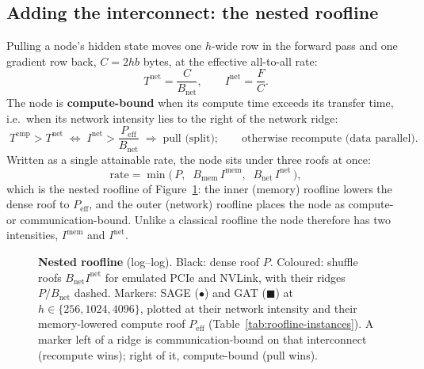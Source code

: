 

\subsection{Adding the interconnect: the nested roofline}
\label{sec:roofline-net}

Pulling a node's hidden state moves one $h$-wide row in the forward pass and one gradient row
back, $C = 2hb$ bytes, at the effective all-to-all rate:
\begin{equation}
  T^{\mathrm{net}} = \frac{C}{B_{\mathrm{net}}}, \qquad
  I^{\mathrm{net}} = \frac{F}{C}.
  \label{eq:Tnet}
\end{equation}
The node is \textbf{compute-bound} when its compute time exceeds its transfer time, i.e.\ when
its network intensity lies to the right of the network ridge:
\begin{equation}
  \boxed{\;
  T^{\mathrm{cmp}} > T^{\mathrm{net}}
  \;\Longleftrightarrow\;
  I^{\mathrm{net}} > \frac{P_{\mathrm{eff}}}{B_{\mathrm{net}}}
  \;\Longrightarrow\; \text{pull (split)};\qquad
  \text{otherwise recompute (data parallel).}
  \;}
  \label{eq:ridge}
\end{equation}
Written as a single attainable rate, the node sits under three roofs at once:
\begin{equation}
  \text{rate} = \min\!\big(\, P,\;\; B_{\mathrm{mem}}\, I^{\mathrm{mem}},\;\; B_{\mathrm{net}}\, I^{\mathrm{net}} \,\big),
  \label{eq:nested}
\end{equation}
which is the nested roofline of Figure~\ref{fig:roofline}: the inner (memory) roofline lowers
the dense roof to $P_{\mathrm{eff}}$, and the outer (network) roofline places the node as
compute- or communication-bound. Unlike a classical roofline the node therefore has two
intensities, $I^{\mathrm{mem}}$ and $I^{\mathrm{net}}$.

\begin{figure}[h]
  \centering
  
  \caption{\textbf{Nested roofline} (log--log). Black: dense roof $P$. Coloured: shuffle
  roofs $B_{\mathrm{net}} I^{\mathrm{net}}$ for emulated PCIe and NVLink, with their ridges
  $P/B_{\mathrm{net}}$ dashed. Markers: SAGE ($\bullet$) and GAT ($\blacksquare$) at
  $h\in\{256,1024,4096\}$, plotted at their network intensity and their memory-lowered
  compute roof $P_{\mathrm{eff}}$ (Table~\ref{tab:roofline-instances}). A marker left of a
  ridge is communication-bound on that interconnect (recompute wins); right of it,
  compute-bound (pull wins).}
  \label{fig:roofline}
\end{figure}

